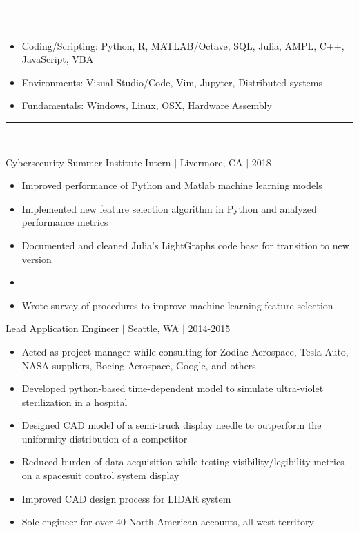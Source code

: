 \documentclass[11pt]{article}
\begin{document}
\vspace{8pt}\hrule\vspace{10pt}
\\
\vspace{-10pt}

\begin{itemize}
\item Coding/Scripting: Python, R, MATLAB/Octave, SQL, Julia, AMPL, C++, JavaScript, VBA
\item Environments: Visual Studio/Code, Vim, Jupyter, Distributed systems
\item Fundamentals: Windows, Linux, OSX, Hardware Assembly
\end{itemize}

\vspace{8pt}\hrule\vspace{10pt}
\\
\vspace{-8pt}

\hfill{Cybersecurity Summer Institute Intern $|$ Livermore, CA $|$ 2018}

\begin{itemize}
\item Improved performance of Python and Matlab machine learning models
\item Implemented new feature selection algorithm in Python and analyzed performance metrics
\item Documented and cleaned Julia's LightGraphs code base for transition to new version
\item 
\item Wrote survey of procedures to improve machine learning feature selection
\end{itemize}

\hfill { Lead Application Engineer $|$ Seattle, WA $|$ 2014-2015}

\begin{itemize}
\item Acted as project manager while consulting for Zodiac Aerospace, Tesla Auto, NASA suppliers, Boeing Aerospace, Google, and others
\item Developed python-based time-dependent model to simulate ultra-violet sterilization in a hospital
\item Designed CAD model of a semi-truck display needle to outperform the uniformity distribution of a competitor
\item Reduced burden of data acquisition while testing visibility/legibility metrics on a spacesuit control system display
\item Improved CAD design process for LIDAR system
\item Sole engineer for over 40 North American accounts, all west territory
\end{itemize}
\end{document}
